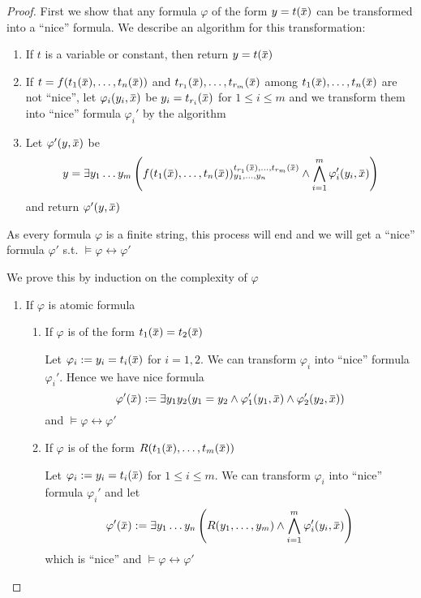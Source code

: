 \documentclass[11pt]{article}
\begin{document}
\begin{proof}
First we show that any formula \(\varphi\) of the form \(y=t(\barx)\) can be transformed into a
``nice'' formula. We describe an algorithm for this transformation:
\begin{enumerate}
\item If \(t\) is a variable or constant, then return \(y=t(\barx)\)
\item If \(t=f(t_1(\barx),\dots,t_n(\barx))\) and
 \(t_{r_1}(\barx),\dots,t_{r_m}(\barx)\) among \(t_1(\barx),\dots,t_n(\barx)\) are not ``nice'', let
\(\varphi_i(y_i,\barx)\) be \(y_i=t_{r_i}(\barx)\) for \(1\le i\le m\) and we transform them into ``nice''
formula \(\varphi_i'\) by the algorithm
\item Let \(\varphi'(y,\barx)\) be
\begin{equation*}
y=\exists y_1\dots y_m\left( f(t_1(\barx),\dots,t_n(\barx))^{t_{r_1}(\barx),\dots,t_{r_m}(\barx)}_{y_1,\dots,y_n}
\wedge\bigwedge_{i=1}^m\varphi_i'(y_i,\barx)
 \right)
\end{equation*}
and return \(\varphi'(y,\barx)\)
\end{enumerate}
As every formula \(\varphi\) is a finite string, this process will end and we will get a ``nice'' formula \(\varphi'\)
s.t. \(\vDash\varphi\leftrightarrow\varphi'\)

We prove this by induction on the complexity of \(\varphi\)
\begin{enumerate}
\item If \(\varphi\) is atomic formula
\begin{enumerate}
\item If \(\varphi\) is of the form \(t_1(\barx)=t_2(\barx)\)

Let \(\varphi_i:=y_i=t_i(\barx)\) for \(i=1,2\). We can transform \(\varphi_i\) into ``nice'' formula \(\varphi_i'\).
Hence we have nice formula
\begin{equation*}
\varphi'(\barx):=\exists y_1y_2(y_1=y_2\wedge\varphi_1'(y_1,\barx)\wedge\varphi_2'(y_2,\barx))
\end{equation*}
and \(\vDash\varphi\leftrightarrow\varphi'\)

\item If \(\varphi\) is of the form \(R(t_1(\barx),\dots,t_m(\barx))\)

Let \(\varphi_i:=y_i=t_i(\barx)\) for \(1\le i\le m\). We can transform \(\varphi_i\) into ``nice'' formula \(\varphi_i'\)
and let
\begin{equation*}
\varphi'(\barx):=\exists y_1\dots y_n\left(
R(y_1,\dots,y_m)\wedge\bigwedge_{i=1}^m\varphi_i'(y_i,\barx)\right)
\end{equation*}
which is  ``nice'' and \(\vDash\varphi\leftrightarrow\varphi'\)
\end{enumerate}


\end{enumerate}
\end{proof}
\end{document}
